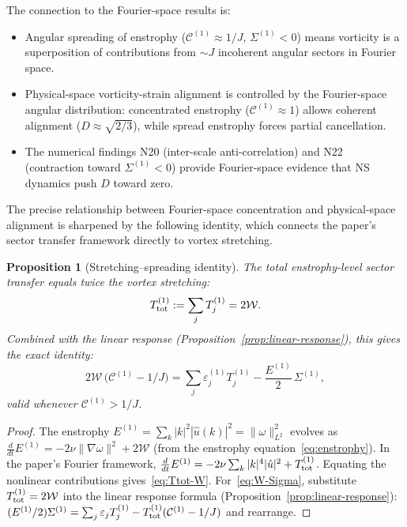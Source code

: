 \documentclass[11pt]{article}
\newtheorem{proposition}[theorem]{Proposition}
\theoremstyle{definition}
\newcommand{\cC}{\mathcal{C}}
\begin{document}
The connection to the Fourier-space results is:
\begin{itemize}[leftmargin=2em]
\item Angular spreading of enstrophy
  ($\cC^{(1)}\approx 1/J$, $\Sigma^{(1)}<0$) means
  vorticity is a superposition of contributions from
  $\sim J$ incoherent angular sectors in Fourier space.
\item Physical-space vorticity-strain alignment is
  controlled by the Fourier-space angular distribution:
  concentrated enstrophy ($\cC^{(1)}\approx 1$) allows
  coherent alignment ($D\approx\sqrt{2/3}$), while
  spread enstrophy forces partial cancellation.
\item The numerical findings N20 (inter-scale
  anti-correlation) and N22 (contraction toward
  $\Sigma^{(1)}<0$) provide Fourier-space evidence that
  NS dynamics push $D$ toward zero.
\end{itemize}
The precise relationship between Fourier-space
concentration and physical-space alignment is
sharpened by the following identity, which
connects the paper's sector transfer framework
directly to vortex stretching.

\begin{proposition}[Stretching--spreading identity]
\label{prop:stretching-spreading}
The total enstrophy-level sector transfer equals
twice the vortex stretching:
\begin{equation}\label{eq:Ttot-W}
T_{\rm tot}^{(1)} := \sum_j T_j^{(1)} = 2\mathcal{W}.
\end{equation}
Combined with the linear response
(Proposition~\textup{\ref{prop:linear-response}}),
this gives the exact identity:
\begin{equation}\label{eq:W-Sigma}
2\mathcal{W}\,\bigl(\cC^{(1)}-1/J\bigr)
= \sum_j \varepsilon_j^{(1)} T_j^{(1)}
- \frac{E^{(1)}}{2}\,\Sigma^{(1)},
\end{equation}
valid whenever $\cC^{(1)}>1/J$.
\end{proposition}

\begin{proof}
The enstrophy $E^{(1)}=\sum_k|k|^2|\hat u(k)|^2
=\|\omega\|_{L^2}^2$ evolves as
$\frac{d}{dt}E^{(1)} = -2\nu\|\nabla\omega\|^2
+ 2\mathcal{W}$
(from the enstrophy
equation~\eqref{eq:enstrophy}).  In the paper's
Fourier framework,
$\frac{d}{dt}E^{(1)} = -2\nu\sum_k|k|^4|\hat u|^2
+ T_{\rm tot}^{(1)}$.
Equating the nonlinear contributions
gives~\eqref{eq:Ttot-W}.
For~\eqref{eq:W-Sigma}, substitute
$T_{\rm tot}^{(1)}=2\mathcal{W}$ into the
linear response formula
(Proposition~\ref{prop:linear-response}):
$(E^{(1)}/2)\Sigma^{(1)}
= \sum_j\varepsilon_j T_j^{(1)}
- T_{\rm tot}^{(1)}(\cC^{(1)}-1/J)$
and rearrange.
\end{proof}
\end{document}
